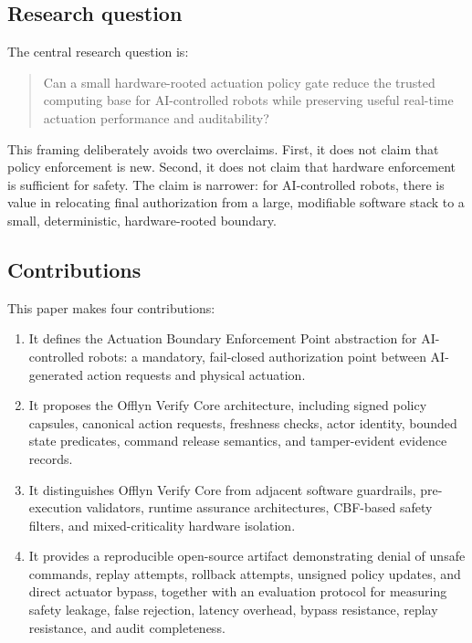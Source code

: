 \documentclass[10pt]{article}
\newcommand{\ovc}{Offlyn Verify Core\xspace}
\newcommand{\abep}{Actuation Boundary Enforcement Point\xspace}
\begin{document}
\subsection{Research question}

The central research question is:

\begin{quote}
Can a small hardware-rooted actuation policy gate reduce the trusted computing base for AI-controlled robots while preserving useful real-time actuation performance and auditability?
\end{quote}

This framing deliberately avoids two overclaims. First, it does not claim that policy enforcement is new. Second, it does not claim that hardware enforcement is sufficient for safety. The claim is narrower: for AI-controlled robots, there is value in relocating final authorization from a large, modifiable software stack to a small, deterministic, hardware-rooted boundary.

\subsection{Contributions}

This paper makes four contributions:

\begin{enumerate}[leftmargin=*]
  \item It defines the \abep abstraction for AI-controlled robots: a mandatory, fail-closed authorization point between AI-generated action requests and physical actuation.
  \item It proposes the \ovc architecture, including signed policy capsules, canonical action requests, freshness checks, actor identity, bounded state predicates, command release semantics, and tamper-evident evidence records.
  \item It distinguishes \ovc from adjacent software guardrails, pre-execution validators, runtime assurance architectures, CBF-based safety filters, and mixed-criticality hardware isolation.
  \item It provides a reproducible open-source artifact demonstrating denial of unsafe commands, replay attempts, rollback attempts, unsigned policy updates, and direct actuator bypass, together with an evaluation protocol for measuring safety leakage, false rejection, latency overhead, bypass resistance, replay resistance, and audit completeness.
\end{enumerate}
\end{document}
